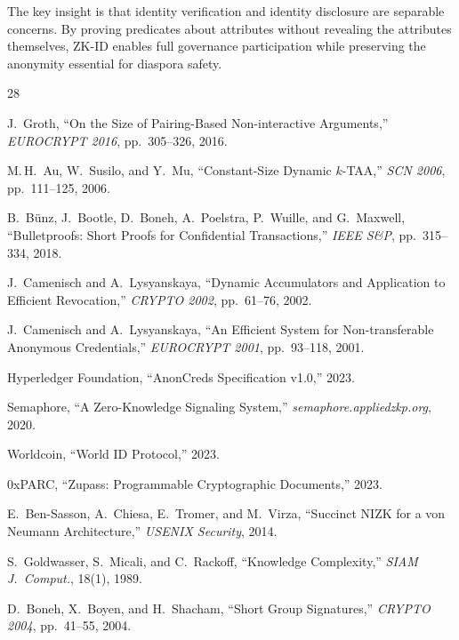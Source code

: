 \documentclass[11pt,a4paper]{article}
\begin{document}
The key insight is that identity verification and identity disclosure are
separable concerns.  By proving predicates about attributes without
revealing the attributes themselves, ZK-ID enables full governance
participation while preserving the anonymity essential for diaspora safety.


\begin{thebibliography}{28}

J.~Groth,
``On the Size of Pairing-Based Non-interactive Arguments,''
\emph{EUROCRYPT 2016}, pp.~305--326, 2016.

M.\,H.~Au, W.~Susilo, and Y.~Mu,
``Constant-Size Dynamic $k$-TAA,''
\emph{SCN 2006}, pp.~111--125, 2006.

B.~B\"unz, J.~Bootle, D.~Boneh, A.~Poelstra, P.~Wuille, and G.~Maxwell,
``Bulletproofs: Short Proofs for Confidential Transactions,''
\emph{IEEE S\&P}, pp.~315--334, 2018.

J.~Camenisch and A.~Lysyanskaya,
``Dynamic Accumulators and Application to Efficient Revocation,''
\emph{CRYPTO 2002}, pp.~61--76, 2002.

J.~Camenisch and A.~Lysyanskaya,
``An Efficient System for Non-transferable Anonymous Credentials,''
\emph{EUROCRYPT 2001}, pp.~93--118, 2001.

Hyperledger Foundation,
``AnonCreds Specification v1.0,''
2023.

Semaphore,
``A Zero-Knowledge Signaling System,''
\emph{semaphore.appliedzkp.org}, 2020.

Worldcoin,
``World ID Protocol,''
2023.

0xPARC,
``Zupass: Programmable Cryptographic Documents,''
2023.

E.~Ben-Sasson, A.~Chiesa, E.~Tromer, and M.~Virza,
``Succinct NIZK for a von Neumann Architecture,''
\emph{USENIX Security}, 2014.

S.~Goldwasser, S.~Micali, and C.~Rackoff,
``Knowledge Complexity,''
\emph{SIAM J.\ Comput.}, 18(1), 1989.

D.~Boneh, X.~Boyen, and H.~Shacham,
``Short Group Signatures,''
\emph{CRYPTO 2004}, pp.~41--55, 2004.


\end{thebibliography}
\end{document}
